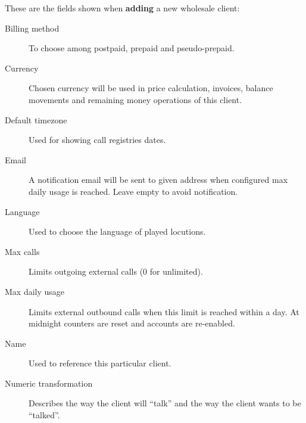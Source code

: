 \documentclass[letterpaper,10pt,spanish]{sphinxmanual}
\begin{document}
These are the fields shown when \textbf{adding} a new wholesale client:
\begin{description}
\item[{Billing method}] \leavevmode{}\label{administration_portal/brand/clients/wholesale:term-billing-method}
To choose among postpaid, prepaid and pseudo-prepaid.

\item[{Currency}] \leavevmode{}\label{administration_portal/brand/clients/wholesale:term-currency}
Chosen currency will be used in price calculation, invoices, balance movements and
remaining money operations of this client.

\item[{Default timezone}] \leavevmode{}\label{administration_portal/brand/clients/wholesale:term-default-timezone}
Used for showing call registries dates.

\item[{Email}] \leavevmode{}\label{administration_portal/brand/clients/wholesale:term-email}
A notification email will be sent to given address when configured max daily usage is reached. Leave empty to
avoid notification.

\item[{Language}] \leavevmode{}\label{administration_portal/brand/clients/wholesale:term-language}
Used to choose the language of played locutions.

\item[{Max calls}] \leavevmode{}\label{administration_portal/brand/clients/wholesale:term-max-calls}
Limits outgoing external calls (0 for unlimited).

\item[{Max daily usage}] \leavevmode{}\label{administration_portal/brand/clients/wholesale:term-max-daily-usage}
Limits external outbound calls when this limit is reached within a day. At midnight counters are reset and
accounts are re-enabled.

\item[{Name}] \leavevmode{}\label{administration_portal/brand/clients/wholesale:term-name}
Used to reference this particular client.

\item[{Numeric transformation}] \leavevmode{}\label{administration_portal/brand/clients/wholesale:term-numeric-transformation}
Describes the way the client will ``talk'' and the way the client wants to be ``talked''.

\end{description}
\end{document}
